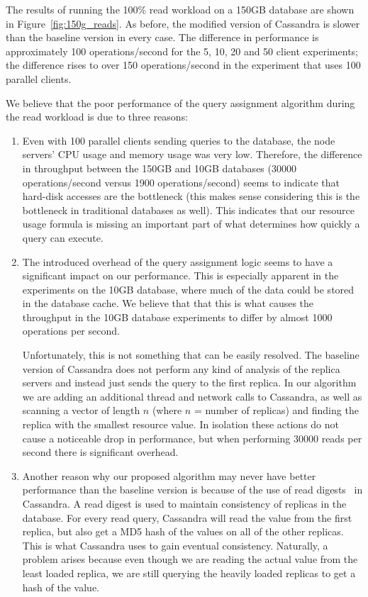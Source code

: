 The results of running the 100\% read workload on a 150GB database are shown in Figure~\ref{fig:150g_reads}. As before, the modified version of Cassandra is slower than the baseline version in every case. The difference in performance is approximately 100 operations/second for the 5, 10, 20 and 50 client experiments; the difference rises to over 150 operations/second in the experiment that uses 100 parallel clients.

We believe that the poor performance of the query assignment algorithm during the read workload is due to three reasons:

\begin{enumerate}

\item Even with 100 parallel clients sending queries to the database, the node servers' CPU usage and memory usage was very low. Therefore, the difference in throughput between the 150GB and 10GB databases (30000 operations/second versus 1900 operations/second) seems to indicate that hard-disk accesses are the bottleneck (this makes sense considering this is the bottleneck in traditional databases as well). This indicates that our resource usage formula is missing an important part of what determines how quickly a query can execute.

\item The introduced overhead of the query assignment logic seems to have a significant impact on our performance. This is especially apparent in the experiments on the 10GB database, where much of the data could be stored in the database cache. We believe that that this is what causes the throughput in the 10GB database experiments to differ by almost 1000 operations per second.

Unfortunately, this is not something that can be easily resolved. The baseline version of Cassandra does not perform any kind of analysis of the replica servers and instead just sends the query to the first replica. In our algorithm we are adding an additional thread and network calls to Cassandra, as well as scanning a vector of length $n$ (where $n$ = number of replicas) and finding the replica with the smallest resource value. In isolation these actions do not cause a noticeable drop in performance, but when performing 30000 reads per second there is significant overhead.

\item Another reason why our proposed algorithm may never have better performance than the baseline version is because of the use of read digests~\cite{readDigest} in Cassandra. A read digest is used to maintain consistency of replicas in the database. For every read query, Cassandra will read the value from the first replica, but also get a MD5 hash of the values on all of the other replicas. This is what Cassandra uses to gain eventual consistency. Naturally, a problem arises because even though we are reading the actual value from the least loaded replica, we are still querying the heavily loaded replicas to get a hash of the value.


\end{enumerate}
